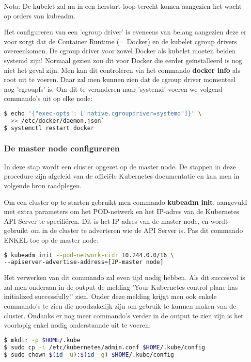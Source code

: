Nota: De kubelet zal nu in een herstart-loop terecht komen aangezien het wacht op orders van kubeadm.

Het configureren van een 'cgroup driver' is eveneens van belang aangezien deze er voor zorgt dat de Container Runtime (= Docker) en de kubelet cgroup drivers overeenkomen. De cgroup driver voor zowel Docker als kubelet moeten beiden systemd zijn! 
Normaal gezien zou dit voor Docker die eerder geïnstalleerd is nog niet het geval zijn. Men kan dit controleren via het commando {\bf docker info} als root uit te voeren. Daar zal men kunnen zien dat de cgroup driver momenteel nog 'cgroupfs' is. Om dit te veranderen naar 'systemd' voeren we volgend commando's uit op elke node: 
\begin{lstlisting}[language=bash]
$ echo '{"exec-opts": ["native.cgroupdriver=systemd"]}' \ 
  >> /etc/docker/daemon.json`
$ systemctl restart docker
\end{lstlisting}

\subsubsection{De master node configureren}
\label{subsubsec:masternodeconfig}

In deze stap wordt een cluster opgezet op de master node. De stappen in deze procedure zijn afgeleid van de officiële Kubernetes documentatie en kan men in volgende bron raadplegen. \autocite{Kubernetes2022b}

Om een cluster op te starten gebruikt men commando {\bf kubeadm init}, aangevuld met extra parameters om het POD-netwerk en het IP-adres van de Kubernetes API Server te specifiëren. Dit is het IP-adres van de master node, en wordt gebruikt om in de cluster te adverteren wie de API Server is. Pas dit commando ENKEL toe op de master node: 
\begin{lstlisting}[language=bash]
$ kubeadm init --pod-network-cidr 10.244.0.0/16 \
--apiserver-advertise-address=[IP-master node]

\end{lstlisting}

Het verwerken van dit commando zal even tijd nodig hebben. Als dit succesvol is zal men onderaan in de output de melding 'Your Kubernetes control-plane has initialized successfully!' zien. Onder deze melding krijgt men ook enkele commando's te zien die noodzakelijk zijn om gebruik te kunnen maken van de cluster. Ondanks er nog meer commando's verder in de output te zien zijn is het voorlopig enkel nodig onderstaande uit te voeren:
\begin{lstlisting}[language=bash]
$ mkdir -p $HOME/.kube
$ sudo cp -i /etc/kubernetes/admin.conf $HOME/.kube/config
$ sudo chown $(id -u):$(id -g) $HOME/.kube/config

\end{lstlisting}

